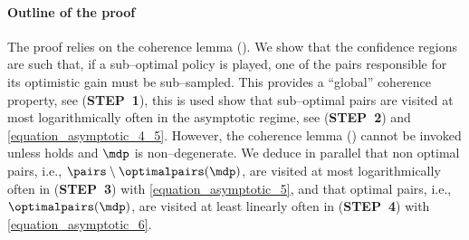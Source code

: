 \documentclass[preprint,cleveref,12pt]{colt2025}
\def\model{\mdp}
\def\optpairs{\optimalpairs}
\def\STEP#1{(\strong{STEP~#1})}
\newcommand{\strong}[1]{\textbf{#1}}
\begin{document}
    \paragraph{Outline of the proof}
    The proof relies on the coherence lemma ().
    We show that the confidence regions are such that, if a sub--optimal policy is played, one of the pairs responsible for its optimistic gain must be sub--sampled.
    This provides a ``global'' coherence property, see \STEP{1}, this is used show that sub--optimal pairs are visited at most logarithmically often in the asymptotic regime, see \STEP{2} and \eqref{equation_asymptotic_4_5}.
    However, the coherence lemma () cannot be invoked unless  holds and $\model$ is non--degenerate.
    We deduce in parallel that non optimal pairs, i.e., $\pairs \setminus \optpairs(\model)$, are visited at most logarithmically often in \STEP{3} with \eqref{equation_asymptotic_5}, and that optimal pairs, i.e., $\optpairs(\model)$, are visited at least linearly often in \STEP{4} with \eqref{equation_asymptotic_6}.
\end{document}

